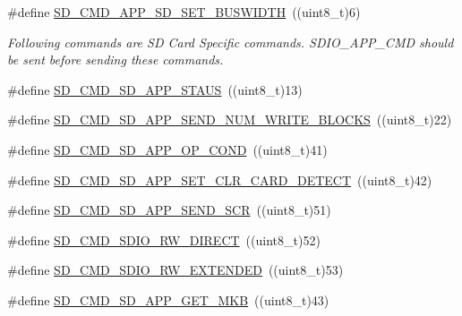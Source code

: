 \begin{DoxyCompactItemize}
\item 
\#define \hyperlink{group___s_t_m324x_g___e_v_a_l___s_d_i_o___s_d___exported___constants_ga1b28ab176d0d05d7f971809aeb07b758}{S\+D\+\_\+\+C\+M\+D\+\_\+\+A\+P\+P\+\_\+\+S\+D\+\_\+\+S\+E\+T\+\_\+\+B\+U\+S\+W\+I\+D\+TH}~((uint8\+\_\+t)6)
\begin{DoxyCompactList}\small\item\em Following commands are SD Card Specific commands. S\+D\+I\+O\+\_\+\+A\+P\+P\+\_\+\+C\+MD should be sent before sending these commands. \end{DoxyCompactList}\item 
\#define \hyperlink{group___s_t_m324x_g___e_v_a_l___s_d_i_o___s_d___exported___constants_ga2984265566ee729869324cf5b842a601}{S\+D\+\_\+\+C\+M\+D\+\_\+\+S\+D\+\_\+\+A\+P\+P\+\_\+\+S\+T\+A\+US}~((uint8\+\_\+t)13)
\item 
\#define \hyperlink{group___s_t_m324x_g___e_v_a_l___s_d_i_o___s_d___exported___constants_gae38cb2fd8f0e7cb42c76e3b11055c424}{S\+D\+\_\+\+C\+M\+D\+\_\+\+S\+D\+\_\+\+A\+P\+P\+\_\+\+S\+E\+N\+D\+\_\+\+N\+U\+M\+\_\+\+W\+R\+I\+T\+E\+\_\+\+B\+L\+O\+C\+KS}~((uint8\+\_\+t)22)
\item 
\#define \hyperlink{group___s_t_m324x_g___e_v_a_l___s_d_i_o___s_d___exported___constants_ga980954ae3a961028fd59f67a1a30a7de}{S\+D\+\_\+\+C\+M\+D\+\_\+\+S\+D\+\_\+\+A\+P\+P\+\_\+\+O\+P\+\_\+\+C\+O\+ND}~((uint8\+\_\+t)41)
\item 
\#define \hyperlink{group___s_t_m324x_g___e_v_a_l___s_d_i_o___s_d___exported___constants_ga713f0d9a7c99b7becea80f232c024b59}{S\+D\+\_\+\+C\+M\+D\+\_\+\+S\+D\+\_\+\+A\+P\+P\+\_\+\+S\+E\+T\+\_\+\+C\+L\+R\+\_\+\+C\+A\+R\+D\+\_\+\+D\+E\+T\+E\+CT}~((uint8\+\_\+t)42)
\item 
\#define \hyperlink{group___s_t_m324x_g___e_v_a_l___s_d_i_o___s_d___exported___constants_ga11c23db52041ccaca4a2dbcafca62c88}{S\+D\+\_\+\+C\+M\+D\+\_\+\+S\+D\+\_\+\+A\+P\+P\+\_\+\+S\+E\+N\+D\+\_\+\+S\+CR}~((uint8\+\_\+t)51)
\item 
\#define \hyperlink{group___s_t_m324x_g___e_v_a_l___s_d_i_o___s_d___exported___constants_ga09d3d2d61d003d6bf75c3fb128e86dbb}{S\+D\+\_\+\+C\+M\+D\+\_\+\+S\+D\+I\+O\+\_\+\+R\+W\+\_\+\+D\+I\+R\+E\+CT}~((uint8\+\_\+t)52)
\item 
\#define \hyperlink{group___s_t_m324x_g___e_v_a_l___s_d_i_o___s_d___exported___constants_gaf40f42039cf756a3805800b48e2790ed}{S\+D\+\_\+\+C\+M\+D\+\_\+\+S\+D\+I\+O\+\_\+\+R\+W\+\_\+\+E\+X\+T\+E\+N\+D\+ED}~((uint8\+\_\+t)53)
\item 
\#define \hyperlink{group___s_t_m324x_g___e_v_a_l___s_d_i_o___s_d___exported___constants_ga4f8828be53bb69d6436c03c9c2f427c6}{S\+D\+\_\+\+C\+M\+D\+\_\+\+S\+D\+\_\+\+A\+P\+P\+\_\+\+G\+E\+T\+\_\+\+M\+KB}~((uint8\+\_\+t)43)

\end{DoxyCompactItemize}
